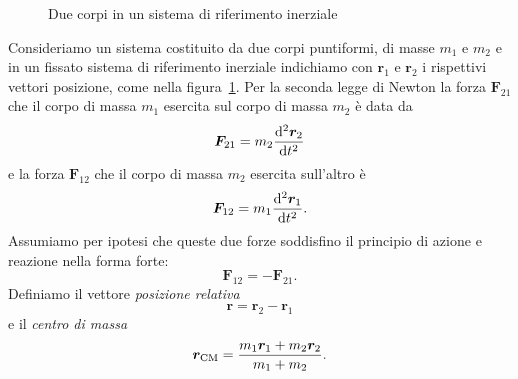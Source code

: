 \begin{figure}
  \centering
{}
  \caption{Due corpi in un sistema di riferimento inerziale}
  \label{fig:due-corpi}
\end{figure}
Consideriamo un sistema costituito da due corpi puntiformi, di masse $m_1$ e
$m_2$ e in un fissato sistema di riferimento inerziale indichiamo con $\bm{r}_1$
e $\bm{r}_2$ i rispettivi vettori posizione, come nella
figura~\ref{fig:due-corpi}. Per la seconda legge di Newton la forza
$\bm{F}_{21}$ che il corpo di massa $m_1$ esercita sul corpo di massa $m_2$ è
data da
\begin{equation}
  \label{eq:f21}
  \bm{F}_{21} = m_2\toder[2]{\bm{r}_2}{t}
\end{equation}
e la forza $\bm{F}_{12}$ che il corpo di massa $m_2$ esercita sull'altro è
\begin{equation}
  \label{eq:f12}
  \bm{F}_{12} = m_1\toder[2]{\bm{r}_1}{t}.
\end{equation}
Assumiamo per ipotesi che queste due forze soddisfino il principio di azione e
reazione nella forma forte:
\begin{equation}
  \label{eq:azione-reazione}
  \bm{F}_{12} = -\bm{F}_{21}.
\end{equation}
Definiamo il vettore \emph{posizione relativa}
\begin{equation}
  \label{eq:posizione-relativa}
  \bm{r}=\bm{r}_2-\bm{r}_1
\end{equation}
e il \emph{centro di massa}
\begin{equation}
  \label{eq:centro-di-massa}
  \bm{r}_\textup{CM} = \frac{m_1\bm{r}_1+m_2\bm{r}_2}{m_1+m_2}.
\end{equation}
